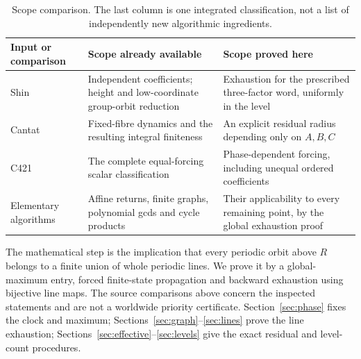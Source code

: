 \begin{table}[t]
\centering
\small
\begin{tabularx}{\textwidth}{@{}p{}YY@{}}
\toprule
Input or comparison & Scope already available & Scope proved here \\
\midrule
Shin \citep{shin2026character}
& Independent coefficients; height and low-coordinate group-orbit reduction
& Exhaustion for the prescribed three-factor word, uniformly in the level \\
Cantat \citep{cantat2009bers}
& Fixed-fibre dynamics and the resulting integral finiteness
& An explicit residual radius depending only on \(A,B,C\) \\
C421 \citep{c4212026integral}
& The complete equal-forcing scalar classification
& Phase-dependent forcing, including unequal ordered coefficients \\
Elementary algorithms
& Affine returns, finite graphs, polynomial gcds and cycle products
& Their applicability to every remaining point, by the global exhaustion proof \\
\bottomrule
\end{tabularx}
\caption{Scope comparison. The last column is one integrated classification,
not a list of independently new algorithmic ingredients.}
\label{tab:ownership}
\end{table}

The mathematical step is the implication that every periodic orbit
above \(R\) belongs to a finite union of whole periodic lines. We prove
it by a global-maximum entry, forced finite-state propagation and
backward exhaustion using bijective line maps. The source comparisons
above concern the inspected statements and are not a worldwide priority
certificate. Section~\ref{sec:phase} fixes the clock and maximum;
Sections~\ref{sec:graph}--\ref{sec:lines} prove the line exhaustion;
Sections~\ref{sec:effective}--\ref{sec:levels} give the exact residual
and level-count procedures.
